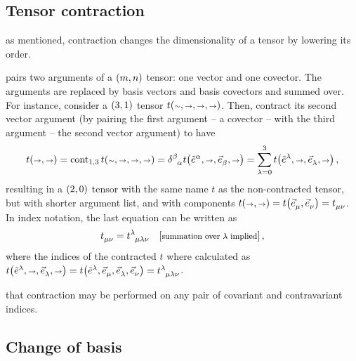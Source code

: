 \subsection{Tensor contraction}
%
 as mentioned, contraction changes the dimensionality of a tensor by lowering its order. 

 pairs two arguments of a $\torder mn$ tensor: one vector and one covector. The arguments are replaced by basis vectors and basis covectors and summed over. For instance, consider a $\torder 31$ tensor $t\vat{\cslot,\vslot,\vslot,\vslot}$. Then, contract its second vector argument (by pairing the first argument -- a covector -- with the third argument -- the second vector argument) to have
%
\begin{equation}\label{eq:examplefofthecontractionofatensor}
  t\vat{\vslot,\vslot} = \cont_{1,3}t\vat{\cslot,\vslot,\vslot,\vslot}
                       = \tkron\beta\alpha t\vat{\tbcov\alpha, \vslot, \tbvec\beta,\vslot}
                       = \sum_{\lambda = 0}^{3}t\vat{\tbcov\lambda, \vslot, \tbvec\lambda,\vslot}\,,
\end{equation}
%
resulting in a $\torder 20$ tensor with the same name $t$ as the non-contracted tensor, but with shorter argument list, and with components $t\vat{\vslot,\vslot} = t\vat{\tbvec\mu,\tbvec\nu} = \tensor{t}{_\mu_\nu}$. In index notation, the last equation can be written as
%
\begin{equation}\label{eq:examplefofthecontractionofatensorindexnotation}
  \tensor{t}{_\mu_\nu} = \tensor{t}{^\lambda_\mu_\lambda_\nu}\quad\eqtxt{summation over $\lambda$ implied} \,,
\end{equation}
%
where the indices of the contracted $t$ where calculated as $t\vat{\tbcov\lambda,\vslot,\tbvec\lambda,\vslot} = t\vat{\tbcov\lambda,\tbvec\mu,\tbvec\lambda,\tbvec\nu} = \tensor{t}{^\lambda_\mu_\lambda_\nu}$.

 that contraction may be performed on any pair of covariant and contravariant indices.


\subsection{Change of basis}
%

